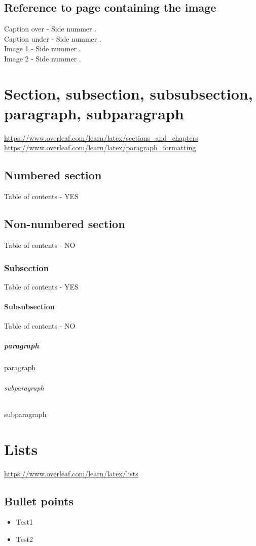 \documentclass{report}
\begin{document}
    \section{Reference to page containing the image}
    Caption over - Side nummer \pageref{fig:cap_over}.\\
    Caption under - Side nummer \pageref{fig:cap_under}.\\
    Image 1 - Side nummer \pageref{fig:image1}.\\
    Image 2 - Side nummer \pageref{fig:image2}.

    \chapter{Section, subsection, subsubsection, paragraph, subparagraph}
    \url{https://www.overleaf.com/learn/latex/sections_and_chapters}\\
    \url{https://www.overleaf.com/learn/latex/paragraph_formatting}
    \section{Numbered section}
    Table of contents - YES
    \section*{Non-numbered section}
    Table of contents - NO
    \subsection{Subsection}
    Table of contents - YES
    \subsubsection{Subsubsection}
    Table of contents - NO
    \paragraph{paragraph}
    paragraph \par
	\subparagraph{subparagraph}
	subparagraph
    
    \chapter{Lists}
    \url{https://www.overleaf.com/learn/latex/lists}
    \section{Bullet points}
    \begin{itemize}
        \item Test1
        \item Test2
    \end{itemize}
\end{document}
